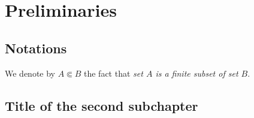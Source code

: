 \chapter{Preliminaries}

\section{Notations}

We denote by $A \Subset B$ the fact that {\sl set $A$ is a finite subset of
set $B$\/}.

\section{Title of the second subchapter}
